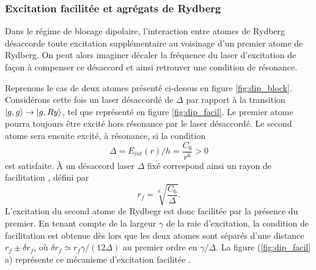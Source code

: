 	\subsubsection*{Excitation facilitée et agrégats de Rydberg}
	
\noindent Dans le régime de blocage dipolaire, l'interaction entre atomes de Rydberg désaccorde toute excitation supplémentaire au voisinage d'un premier atome de Rydberg.
On peut alors imaginer décaler la fréquence du laser d'excitation de façon à compenser ce désaccord et ainsi retrouver une condition de résonance.

Reprenons le cas de deux atomes présenté ci-dessus en figure \eqref{fig:dip_block}.
Considérons cette fois un laser désaccordé de $\Delta$ par rapport à la transition $\ket{g,g} \rightarrow \ket{g,Ry}$, tel que représenté en figure \eqref{fig:dip_facil}.
Le premier atome pourra toujours être excité hors résonance par le laser désaccordé.
Le second atome sera ensuite excité, à résonance, si la condition
%
\begin{equation}
\label{eq:condition_facil}
\Delta = E_{int}(r)/h = \frac{C_6}{r^6} > 0
\end{equation}
%
est satisfaite.
\`A un désaccord laser $\Delta$ fixé correspond ainsi un \og rayon de facilitation \fg{}, défini par
%
\begin{equation}
\label{eq:r_facil}
r_f = \sqrt[6]{\frac{C_6}{\Delta}}.
\end{equation}
%
L'excitation du second atome de Rydbegr est donc \og facilitée \fg{} par la présence du premier.
En tenant compte de la largeur $\gamma$ de la raie d'excitation, la condition de facilitation est obtenue dès lors que les deux atomes sont séparés d'une distance $r_f \pm \delta r_f$,
où %
$\delta r_f \simeq r_f \gamma / (12\Delta)$ au premier ordre en $\gamma / \Delta$.
La figure (\ref{fig:dip_facil} a) représente ce mécanisme d'\og excitation facilitée \fg{} .
%	
